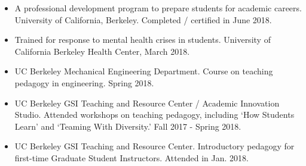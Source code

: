 \documentclass[letterpaper]{deedy-resume} %
\begin{document}
\begin{itemize}

\item {} A professional development program to prepare students for academic careers. University of California, Berkeley. Completed / certified in June 2018.
  
\item {} Trained for response to mental health crises in students. University of California Berkeley Health Center, March 2018.

\item {} UC Berkeley Mechanical Engineering Department. Course on teaching pedagogy in engineering. Spring 2018.
  
\item {} UC Berkeley GSI Teaching and Resource Center / Academic Innovation Studio. Attended workshops on teaching pedagogy, including `How Students Learn' and `Teaming With Diversity.' Fall 2017 - Spring 2018.

\item {} UC Berkeley GSI Teaching and Resource Center. Introductory pedagogy for first-time Graduate Student Instructors. Attended in Jan. 2018.

\end{itemize}


\sectionspace %










\end{document}
